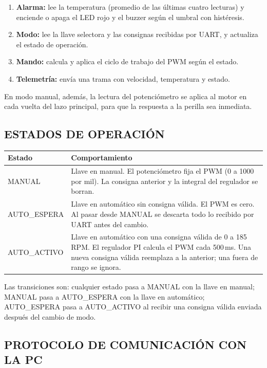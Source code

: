 \begin{enumerate}
  \item \textbf{Alarma:} lee la temperatura (promedio de las últimas cuatro lecturas) y
  enciende o apaga el LED rojo y el buzzer según el umbral con histéresis.
  \item \textbf{Modo:} lee la llave selectora y las consignas recibidas por UART, y
  actualiza el estado de operación.
  \item \textbf{Mando:} calcula y aplica el ciclo de trabajo del PWM según el estado.
  \item \textbf{Telemetría:} envía una trama con velocidad, temperatura y estado.
\end{enumerate}

En modo manual, además, la lectura del potenciómetro se aplica al motor en cada vuelta del
lazo principal, para que la respuesta a la perilla sea inmediata.

\subsection{ESTADOS DE OPERACIÓN}

\begin{longtable}{|p{3.0cm}|p{11.6cm}|}
\hline
\textbf{Estado} & \textbf{Comportamiento} \\ \hline
\endhead
MANUAL & Llave en manual. El potenciómetro fija el PWM (0 a 1000 por mil). La consigna
anterior y la integral del regulador se borran. \\ \hline
AUTO\_ESPERA & Llave en automático sin consigna válida. El PWM es cero. Al pasar desde
MANUAL se descarta todo lo recibido por UART antes del cambio. \\ \hline
AUTO\_ACTIVO & Llave en automático con una consigna válida de 0 a 185 RPM. El regulador PI
calcula el PWM cada 500\,ms. Una nueva consigna válida reemplaza a la anterior; una
fuera de rango se ignora. \\ \hline
\end{longtable}

Las transiciones son: cualquier estado pasa a MANUAL con la llave en manual; MANUAL pasa a
AUTO\_ESPERA con la llave en automático; AUTO\_ESPERA pasa a AUTO\_ACTIVO al recibir una
consigna válida enviada después del cambio de modo.

\subsection{PROTOCOLO DE COMUNICACIÓN CON LA PC}

